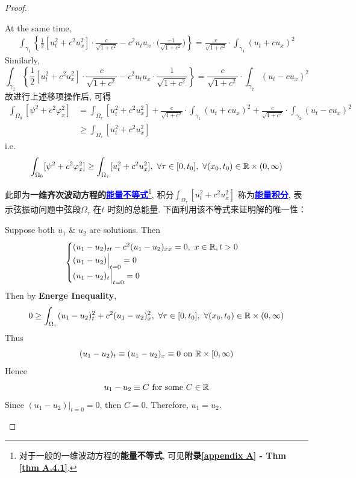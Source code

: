 \begin{thm}
\begin{proof}
\begin{itemize}
				At the same time, 
				\begin{align*}
					\int_{\gamma_1} \left\{ \frac{1}{2} [ u_{t}^2 + c^2 u_{x}^2 ] \cdot \frac{c}{\sqrt{1 + c^2}} - c^2 u_t u_x \cdot \Big( \frac{-1}{\sqrt{1 + c^2}} \Big) \right\} 
					= \frac{c}{\sqrt{1 + c^2}} \cdot \int_{\gamma_1} (u_t + cu_x)^2
				\end{align*}
				Similarly, 
				\[ \int_{\gamma_2} \left\{ \frac{1}{2} [ u_{t}^2 + c^2 u_{x}^2 ] \cdot \frac{c}{\sqrt{1 + c^2}} - c^2 u_t u_x \cdot \frac{1}{\sqrt{1 + c^2}} \right\} 
				= \frac{c}{\sqrt{1 + c^2}} \cdot \int_{\gamma_2} (u_t - cu_x)^2 \]
				故进行上述移项操作后, 可得
				\begin{align*}
					\int_{\Omega_0} [ \psi^2 + c^2 \varphi_{x}^2 ] 
					&= \int_{\Omega_\tau} [ u_{t}^2 + c^2 u_{x}^2 ] 
					+ \frac{c}{\sqrt{1 + c^2}} \cdot \int_{\gamma_1} (u_t + cu_x)^2 
					+ \frac{c}{\sqrt{1 + c^2}} \cdot \int_{\gamma_2} (u_t - cu_x)^2 \\
					&\geq \int_{\Omega_\tau} [ u_{t}^2 + c^2 u_{x}^2 ]
				\end{align*}
				i.e.
				\begin{align}
					\int_{\Omega_0} [ \psi^2 + c^2 \varphi_{x}^2 ] \geq \int_{\Omega_\tau} [ u_{t}^2 + c^2 u_{x}^2 ] , \,\, \forall \tau \in [0 , t_0] , \,\, \forall (x_0 , t_0) \in \mathbb{R} \times (0 , \infty) \label{2.13}
				\end{align}
				
				\vspace*{1.5em}
				
				此即为\textbf{一维齐次波动方程的\underline{\textcolor{blue}{能量不等式}}}\footnote{对于一般的一维波动方程的\textbf{能量不等式}, 可见\textbf{附录\ref{appendix A} - Thm \ref{thm A.4.1}}. }, 积分$\int_{\Omega_\tau} [u_{t}^2 + c^2 u_{x}^2]$ 称为\underline{\textcolor{blue}{\textbf{能量积分}}}, 表示弦振动问题中弦段$\Omega_\tau$ 在$t$ 时刻的总能量. 下面利用该不等式来证明解的唯一性：
				
				\vspace*{1.5em}
				
				Suppose both $u_1 \,\, \& \,\, u_2$ are solutions. Then
				\begin{align*}
					\begin{cases}
						(u_1 - u_2)_{tt} - c^2 (u_1 - u_2)_{xx} = 0 , \,\, x \in \mathbb{R} , t > 0 \\
						(u_1 - u_2) \Big|_{t = 0} = 0 \\
						(u_1 - u_2)_{t} \Big|_{t = 0} = 0
					\end{cases}
				\end{align*}
				Then by \textbf{Energe Inequality}, 
				\[ 0 \geq \int_{\Omega_\tau} (u_1 - u_2)_{t}^2 + c^2 (u_1 - u_2)_{x}^2 , \,\, \forall \tau \in [0 , t_0] , \,\, \forall (x_0 , t_0) \in \mathbb{R} \times (0 , \infty) \]
				Thus
				\[ (u_1 - u_2)_t \equiv (u_1 - u_2)_x \equiv 0 \,\, \text{on} \,\, \mathbb{R} \times [0 , \infty) \]
				Hence
				\[ u_1 - u_2 \equiv C \,\, \text{for some} \,\, C \in \mathbb{R} \]
				Since $(u_1 - u_2) \Big|_{t = 0} = 0$, then $C = 0$. Therefore, $u_1 = u_2$. 
			\end{itemize}
		\end{proof}
	\end{thm}

